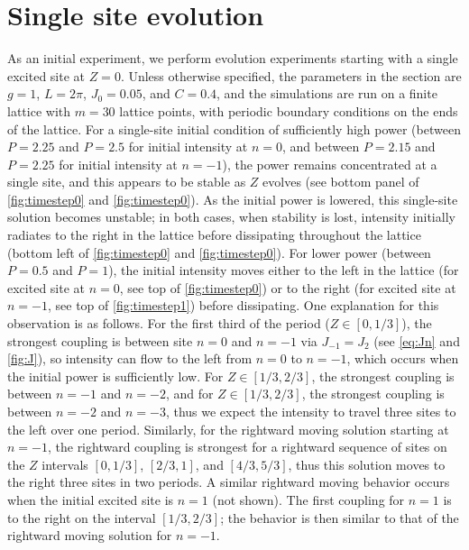 \documentclass[reprint, amsmath,amssymb,aps,pre]{revtex4-2}
\begin{document}
\section{Single site evolution}

As an initial experiment, we perform evolution experiments starting with a single excited site at $Z=0$. Unless otherwise specified, the parameters in the section are $g=1$, $L=2\pi$, $J_0 = 0.05$, and $C=0.4$, and the simulations are run on a finite lattice with $m=30$ lattice points, with periodic boundary conditions on the ends of the lattice. For a single-site initial condition of sufficiently high power (between $P=2.25$ and $P=2.5$ for initial intensity at $n=0$, and between $P=2.15$ and $P=2.25$ for initial intensity at $n=-1$), the power remains concentrated at a single site, and this appears to be stable as $Z$ evolves (see bottom panel of \cref{fig:timestep0} and \cref{fig:timestep0}). As the initial power is lowered, this single-site solution becomes unstable; in both cases, when stability is lost, intensity initially radiates to the right in the lattice before dissipating throughout the lattice (bottom left of \cref{fig:timestep0} and \cref{fig:timestep0}). For lower power (between $P=0.5$ and $P=1$), the initial intensity moves either to the left in the lattice (for excited site at $n=0$, see top of \cref{fig:timestep0}) or to the right (for excited site at $n=-1$, see top of \cref{fig:timestep1}) before dissipating. One explanation for this observation is as follows. For the first third of the period ($Z \in [0,1/3]$), the strongest coupling is between site $n=0$ and $n=-1$ via $J_{-1} = J_2$ (see \cref{eq:Jn} and \cref{fig:J}), so intensity can flow to the left from $n=0$ to $n=-1$, which occurs when the initial power is sufficiently low. For $Z \in [1/3,2/3]$, the strongest coupling is between $n=-1$ and $n=-2$, and for $Z \in [1/3,2/3]$, the strongest coupling is between $n=-2$ and $n=-3$, thus we expect the intensity to travel three sites to the left over one period. Similarly, for the rightward moving solution starting at $n=-1$, the rightward coupling is strongest for a rightward sequence of sites on the $Z$ intervals $[0,1/3]$, $[2/3,1]$, and $[4/3,5/3]$, thus this solution moves to the right three sites in two periods. A similar rightward moving behavior occurs when the initial excited site is $n=1$ (not shown). The first coupling for $n=1$ is to the right on the interval $[1/3, 2/3]$; the behavior is then similar to that of the rightward moving solution for $n=-1$. 
\end{document}
